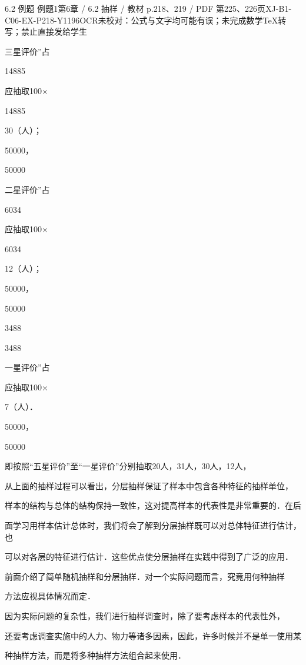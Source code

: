 \begin{bankitem}{6.2 例题 例题1}{第6章 / 6.2 抽样 / 教材 p.218、219 / PDF 第225、226页}{XJ-B1-C06-EX-P218-Y1196}{OCR未校对：公式与文字均可能有误；未完成数学TeX转写；禁止直接发给学生}
\begin{ocrdraft}
\par
三星评价”占
\par
14885
\par
应抽取100\ensuremath{\times}
\par
14885
\par
30（人）；
\par
50000，
\par
50000
\par
二星评价”占
\par
6034
\par
应抽取100\ensuremath{\times}
\par
6034
\par
12（人）；
\par
50000，
\par
50000
\par
3488
\par
3488
\par
一星评价”占
\par
应抽取100\ensuremath{\times}
\par
7（人）．
\par
50000，
\par
50000
\par
即按照“五星评价”至“一星评价”分别抽取20人，31人，30人，12人，
\par
从上面的抽样过程可以看出，分层抽样保证了样本中包含各种特征的抽样单位，
\par
样本的结构与总体的结构保持一致性，这对提高样本的代表性是非常重要的．在后
\par
面学习用样本估计总体时，我们将会了解到分层抽样既可以对总体特征进行估计，也
\par
可以对各层的特征进行估计．这些优点使分层抽样在实践中得到了广泛的应用．
\par
前面介绍了简单随机抽样和分层抽样．对一个实际问题而言，究竟用何种抽样
\par
方法应视具体情况而定．
\par
因为实际问题的复杂性，我们进行抽样调查时，除了要考虑样本的代表性外，
\par
还要考虑调查实施中的人力、物力等诸多因素，因此，许多时候并不是单一使用某
\par
种抽样方法，而是将多种抽样方法组合起来使用．
\end{ocrdraft}
\end{bankitem}
